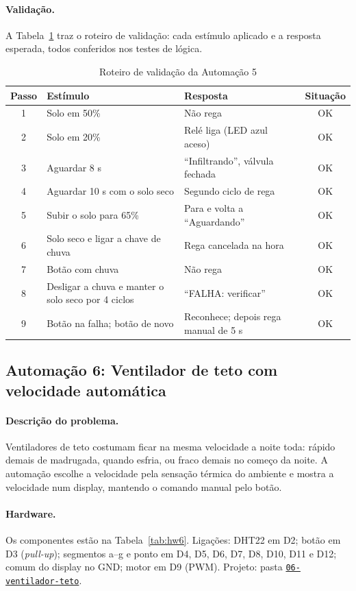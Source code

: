 \documentclass[12pt]{article}
\newcommand{\repositorio}{https://github.com/M-Beserra/Trabalho-sistemas-embarcadosA2}
\newcommand{\pasta}[1]{\href{\repositorio/tree/main/#1}{\texttt{#1}}}
\begin{document}
\paragraph{Validação.} A Tabela~\ref{tab:val5} traz o roteiro de validação: cada estímulo aplicado e a resposta esperada, todos conferidos nos testes de lógica.

\begin{table}[ht]
\centering
\caption{Roteiro de validação da Automação 5}\label{tab:val5}
\footnotesize
\begin{tabularx}{\textwidth}{cXXc}
\toprule
Passo & Estímulo & Resposta & Situação \\
\midrule
1 & Solo em 50\% & Não rega & OK \\
2 & Solo em 20\% & Relé liga (LED azul aceso) & OK \\
3 & Aguardar 8 s & ``Infiltrando'', válvula fechada & OK \\
4 & Aguardar 10 s com o solo seco & Segundo ciclo de rega & OK \\
5 & Subir o solo para 65\% & Para e volta a ``Aguardando'' & OK \\
6 & Solo seco e ligar a chave de chuva & Rega cancelada na hora & OK \\
7 & Botão com chuva & Não rega & OK \\
8 & Desligar a chuva e manter o solo seco por 4 ciclos & ``FALHA: verificar'' & OK \\
9 & Botão na falha; botão de novo & Reconhece; depois rega manual de 5 s & OK \\
\bottomrule
\end{tabularx}
\end{table}

\subsection{Automação 6: Ventilador de teto com velocidade automática}\label{sub:a6}

\paragraph{Descrição do problema.} Ventiladores de teto costumam ficar na mesma velocidade a noite toda: rápido demais de madrugada, quando esfria, ou fraco demais no começo da noite. A automação escolhe a velocidade pela sensação térmica do ambiente e mostra a velocidade num display, mantendo o comando manual pelo botão.

\paragraph{Hardware.} Os componentes estão na Tabela~\ref{tab:hw6}. Ligações: DHT22 em D2; botão em D3 (\emph{pull-up}); segmentos a--g e ponto em D4, D5, D6, D7, D8, D10, D11 e D12; comum do display no GND; motor em D9 (PWM). Projeto: pasta \pasta{06-ventilador-teto}.
\end{document}
